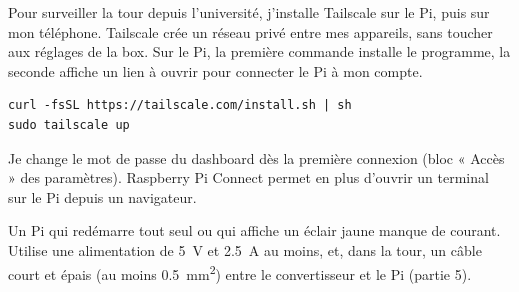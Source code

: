 Pour surveiller la tour depuis l'université, j'installe Tailscale sur le Pi, puis sur mon téléphone. Tailscale crée un réseau privé entre mes appareils, sans toucher aux réglages de la box. Sur le Pi, la première commande installe le programme, la seconde affiche un lien à ouvrir pour connecter le Pi à mon compte.

\begin{verbatim}
curl -fsSL https://tailscale.com/install.sh | sh
sudo tailscale up
\end{verbatim}

Je change le mot de passe du dashboard dès la première connexion (bloc « Accès » des paramètres). Raspberry Pi Connect permet en plus d'ouvrir un terminal sur le Pi depuis un navigateur.

\begin{attention}
Un Pi qui redémarre tout seul ou qui affiche un éclair jaune manque de courant. Utilise une alimentation de \qty{5}{V} et \qty{2,5}{A} au moins, et, dans la tour, un câble court et épais (au moins \qty{0,5}{mm^2}) entre le convertisseur et le Pi (partie 5).
\end{attention}

